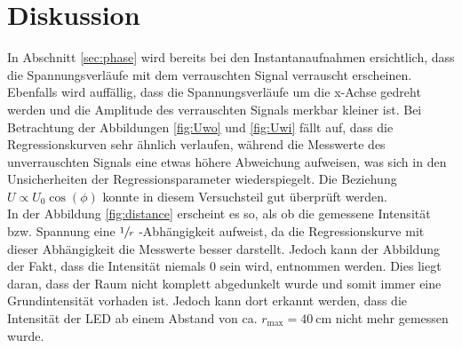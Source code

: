\section{Diskussion}
\label{sec:Diskussion}
In Abschnitt \ref{sec:phase} wird bereits bei den Instantanaufnahmen ersichtlich, dass die Spannungsverläufe mit dem verrauschten Signal
verrauscht erscheinen. 
Ebenfalls wird auffällig, dass die Spannungsverläufe um die x-Achse gedreht werden und die Amplitude des verrauschten Signals merkbar kleiner ist.
Bei Betrachtung der Abbildungen \ref{fig:Uwo} und \ref{fig:Uwi} fällt auf, dass die Regressionskurven sehr ähnlich verlaufen, während die Messwerte 
des unverrauschten Signals eine etwas höhere Abweichung aufweisen, was sich in den Unsicherheiten der Regressionsparameter
wiederspiegelt.
Die Beziehung $U \propto U_0 \cos (\phi )$ konnte in diesem Versuchsteil gut überprüft werden.\\
In der Abbildung \ref{fig:distance} erscheint es so, als ob die gemessene Intensität bzw. Spannung eine 
$\sfrac{1}{r}$ -Abhängigkeit aufweist, da die Regressionskurve mit dieser Abhängigkeit die Messwerte besser darstellt.
Jedoch kann der Abbildung der Fakt, dass die Intensität niemals 0 sein wird, entnommen werden.
Dies liegt daran, dass der Raum nicht komplett abgedunkelt wurde und somit immer eine Grundintensität vorhaden ist.
Jedoch kann dort erkannt werden, dass die Intensität der LED ab einem Abstand von ca. $r_\text{max} = \SI{40}{\centi\metre}$ nicht mehr gemessen wurde. 